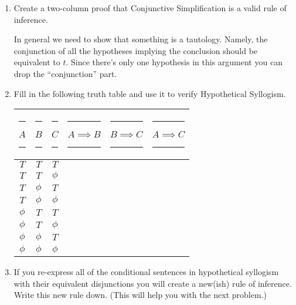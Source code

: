 \documentclass{amsart}
\begin{document}
\begin{enumerate}
\vfill

\newpage

\item Create a two-column proof that Conjunctive Simplification is a valid rule of inference.

In general we need to show that something is a tautology.  Namely, the conjunction of all the hypotheses implying the conclusion should be equivalent to $t$. Since there's only one hypothesis in this argument you can drop the ``conjunction'' part.

\vfill

\newpage

\item Fill in the following truth table and use it to verify Hypothetical Syllogism.

\vspace{.2in}

\hspace{-.5in}
\begin{tabular}{c|c|c||c|c||c}
\rule[-6pt]{0pt}{24pt} \rule{8pt}{0pt} $A$ \rule{8pt}{0pt} & \rule{8pt}{0pt} $B$ \rule{8pt}{0pt} & \rule{8pt}{0pt} $C$ \rule{8pt}{0pt} & \rule{8pt}{0pt} $A \implies B$ \rule{8pt}{0pt} & \rule{8pt}{0pt} $B \implies C$ \rule{8pt}{0pt} & \rule{8pt}{0pt} $A \implies C$ \rule{8pt}{0pt} \\ \hline
\rule[-6pt]{0pt}{24pt} $T$    & $T$    & $T$    & & & \\
\rule[-6pt]{0pt}{24pt} $T$    & $T$    & $\phi$ & & & \\
\rule[-6pt]{0pt}{24pt} $T$    & $\phi$ & $T$    & & & \\
\rule[-6pt]{0pt}{24pt} $T$    & $\phi$ & $\phi$ & & & \\ \hline
\rule[-6pt]{0pt}{24pt} $\phi$ & $T$    & $T$    & & & \\
\rule[-6pt]{0pt}{24pt} $\phi$ & $T$    & $\phi$ & & & \\
\rule[-6pt]{0pt}{24pt} $\phi$ & $\phi$ & $T$    & & & \\
\rule[-6pt]{0pt}{24pt} $\phi$ & $\phi$ & $\phi$ & & & \\
\end{tabular}

\vspace{.5in}

\item If you re-express all of the conditional sentences in hypothetical syllogism with their equivalent disjunctions
you will create a new(ish) rule of inference.  Write this new rule down.  (This will help you with the next problem.)


\end{enumerate}
\end{document}
